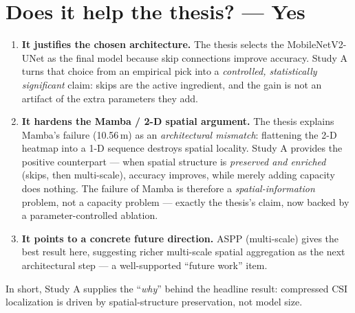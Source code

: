 \documentclass[11pt]{article}
\begin{document}
\section{Does it help the thesis? --- Yes}
\begin{enumerate}[leftmargin=1.5em,itemsep=4pt]
\item \textbf{It justifies the chosen architecture.} The thesis selects the MobileNetV2-UNet as
      the final model because skip connections improve accuracy. Study A turns that choice from
      an empirical pick into a \emph{controlled, statistically significant} claim: skips are the
      active ingredient, and the gain is not an artifact of the extra parameters they add.

\item \textbf{It hardens the Mamba / 2-D spatial argument.} The thesis explains Mamba's failure
      (10.56\,m) as an \emph{architectural mismatch}: flattening the 2-D heatmap into a 1-D
      sequence destroys spatial locality. Study A provides the positive counterpart --- when
      spatial structure is \emph{preserved and enriched} (skips, then multi-scale), accuracy
      improves, while merely adding capacity does nothing. The failure of Mamba is therefore a
      \emph{spatial-information} problem, not a capacity problem --- exactly the thesis's claim,
      now backed by a parameter-controlled ablation.

\item \textbf{It points to a concrete future direction.} ASPP (multi-scale) gives the best
      result here, suggesting richer multi-scale spatial aggregation as the next architectural
      step --- a well-supported ``future work'' item.
\end{enumerate}

In short, Study A supplies the ``\emph{why}'' behind the headline result: compressed CSI
localization is driven by spatial-structure preservation, not model size.

\end{document}
